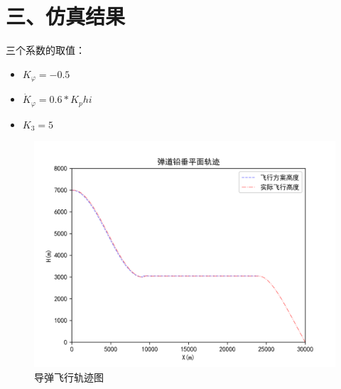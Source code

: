 \documentclass[UTF8]{ctexart}
\begin{document}
\section*{ 三、仿真结果}

    
三个系数的取值：
    \begin{itemize}
        \item[]$K_\varphi = - 0.5$
        \item[]$\dot{K}_\varphi= 0.6* K_phi$
        \item[]$K_3= 5$
    \end{itemize}



\begin{figure}[H]
    \centering
    \includegraphics[width=130mm]{img/飞行轨迹.png}
    \caption{导弹飞行轨迹图}
\end{figure}
\end{document}
